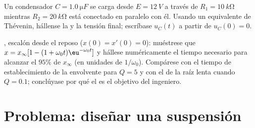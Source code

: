 \begin{exercise}[$\star\star\star$]\label{exo:b1:transient-regimes:11}
Un condensador $C = \qty{1.0}{\micro F}$ se carga desde $E = \qty{12}{V}$
a través de $R_1 = \qty{10}{k\ohm}$ mientras $R_2 = \qty{20}{k\ohm}$ está
conectado en paralelo con él. Usando un equivalente de Thévenin, hállense
la  y la tensión final; escríbase $u_C(t)$ a partir de
$u_C(0) = 0$.
\end{exercise}

\begin{exercise}[$\star\star\star$]\label{exo:b1:transient-regimes:12}
, escalón desde el reposo ($x(0) = x'(0) = 0$): muéstrese
que $x = x_\infty[1 - (1 + \omega_0 t)\eu^{-\omega_0 t}]$ y hállese
numéricamente el tiempo necesario para alcanzar el $95\%$ de $x_\infty$
(en unidades de $1/\omega_0$). Compárese con el tiempo de establecimiento
de la envolvente para $Q = 5$ y con el de la raíz lenta cuando $Q = 0.1$;
conclúyase por qué el  es el objetivo del ingeniero.
\end{exercise}

\section{Problema: diseñar una suspensión}

